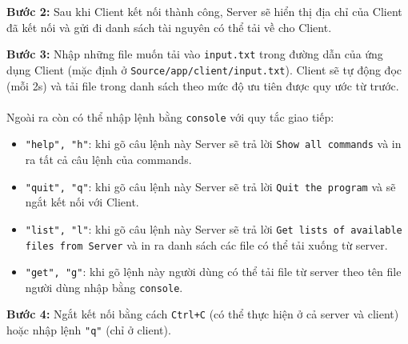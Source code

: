\documentclass[a4paper,12pt]{report}
\begin{document}
\begin{description}
  \item \textbf{Bước 2:} Sau khi Client kết nối thành công, Server sẽ hiển thị địa chỉ của Client đã kết nối và gửi đi danh sách tài nguyên có thể tải về cho Client.
  \item \textbf{Bước 3:} Nhập những file muốn tải vào \verb|input.txt| trong đường dẫn của ứng dụng Client (mặc định ở \verb|Source/app/client/input.txt|). Client sẽ tự động đọc (mỗi 2s) và tải file trong danh sách theo mức độ ưu tiên được quy ước từ trước.\\ \\
        Ngoài ra còn có thể nhập lệnh bằng \verb|console| với quy tắc giao tiếp:
        \begin{itemize}
          \item \verb|"help", "h"|: khi gõ câu lệnh này Server sẽ trả lời \texttt{Show all commands} và in ra tất cả câu lệnh của commands.
          \item \verb|"quit", "q"|:  khi gõ câu lệnh này Server sẽ trả lời \texttt{Quit the program} và sẽ ngắt kết nối với Client.
          \item \verb|"list", "l"|:  khi gõ câu lệnh này Server sẽ trả lời \texttt{Get lists of available files from Server} và in ra danh sách các file có thể tải xuống từ server.
          \item \verb|"get", "g"|:  khi gõ lệnh này người dùng có thể tải file từ server theo tên file người dùng nhập bằng \verb|console|.
        \end{itemize}
  \item \textbf{Bước 4:} Ngắt kết nối bằng cách \verb|Ctrl+C| (có thể thực hiện ở cả server và client) hoặc nhập lệnh \verb|"q"| (chỉ ở client).
\end{description}

\pagebreak
\end{document}
